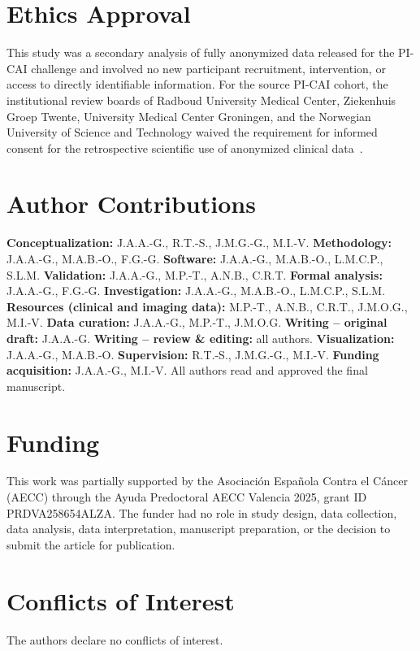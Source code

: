 \documentclass[11pt]{article}
\begin{document}
\section*{Ethics Approval}
This study was a secondary analysis of fully anonymized data released for the
PI-CAI challenge and involved no new participant recruitment, intervention, or
access to directly identifiable information. For the source PI-CAI cohort, the
institutional review boards of Radboud University Medical Center, Ziekenhuis
Groep Twente, University Medical Center Groningen, and the Norwegian University
of Science and Technology waived the requirement for informed consent for the
retrospective scientific use of anonymized clinical
data~\citep{saha2023artificial}.

\section*{Author Contributions}
\textbf{Conceptualization:} J.A.A.-G., R.T.-S., J.M.G.-G., M.I.-V.
\textbf{Methodology:} J.A.A.-G., M.A.B.-O., F.G.-G.
\textbf{Software:} J.A.A.-G., M.A.B.-O., L.M.C.P., S.L.M.
\textbf{Validation:} J.A.A.-G., M.P.-T., A.N.B., C.R.T.
\textbf{Formal analysis:} J.A.A.-G., F.G.-G.
\textbf{Investigation:} J.A.A.-G., M.A.B.-O., L.M.C.P., S.L.M.
\textbf{Resources (clinical and imaging data):} M.P.-T., A.N.B., C.R.T., J.M.O.G., M.I.-V.
\textbf{Data curation:} J.A.A.-G., M.P.-T., J.M.O.G.
\textbf{Writing -- original draft:} J.A.A.-G.
\textbf{Writing -- review \& editing:} all authors.
\textbf{Visualization:} J.A.A.-G., M.A.B.-O.
\textbf{Supervision:} R.T.-S., J.M.G.-G., M.I.-V.
\textbf{Funding acquisition:} J.A.A.-G., M.I.-V.
All authors read and approved the final manuscript.

\section*{Funding}
This work was partially supported by the Asociaci\'on Espa\~nola Contra el
C\'ancer (AECC) through the Ayuda Predoctoral AECC Valencia 2025, grant ID
PRDVA258654ALZA. The funder had no role in study design, data collection, data
analysis, data interpretation, manuscript preparation, or the decision to submit
the article for publication.

\section*{Conflicts of Interest}
The authors declare no conflicts of interest.



\end{document}

